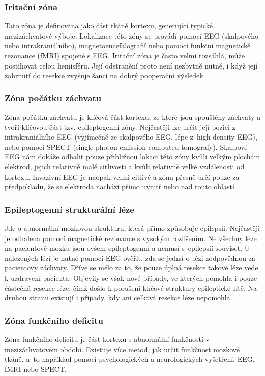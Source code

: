 \subsubsection{Iritační zóna}
Tato zóna je definována jako část tkáně kortexu, generující typické mezizáchvatové výboje. Lokalizace této zóny se provádí pomocí EEG (skalpového nebo intrakraniálního), magnetoencefalografií nebo pomocí funkční magnetické rezonance (fMRI) spojené s EEG. Iritační zóna je často velmi rozsáhlá, může postihovat celou hemisféru. Její odstranění proto není nezbytně nutné, i když její zahrnutí do resekce zvyšuje šanci na dobrý pooperační výsledek. \cite{4}

\subsubsection{Zóna počátku záchvatu}
Zóna počátku záchvatu je klíčová část kortexu, ze které jsou spouštěny záchvaty a tvoří klíčovou část tzv. epileptogenní zóny. Nejčastěji lze určit její pozici z intrakraniálního EEG (vyjímečně ze skalpového EEG, lépe z~high density EEG), nebo pomocí SPECT (single photon emission computed tomografy). Skalpové EEG nám dokáže odhalit pouze přibližnou lokaci této zóny kvůli velkým plochám elektrod, jejich relativně malé citlivosti a kvůli relativně velké vzdálenosti od kortexu. Invazivní EEG je naopak velmi citlivé a zónu přesně určí pouze za předpokladu, že se elektroda nachází přímo uvnitř nebo nad touto oblastí. \cite{4}

\subsubsection{Epileptogenní strukturální léze}
Jde o abnormální mozkovou strukturu, která přímo způsobuje epilepsii. Nejčastěji je odhalena pomocí magnetické rezonance s vysokým rozlišením. Ne všechny léze na pacientově mozku jsou ovšem epileptogenní a nemusí s~epilepsií souviset. U nalezených lézí je nutné pomocí EEG ověřit, zda se jedná o~lézi zodpovědnou za pacientovy záchvaty. Dříve se mělo za to, že pouze úplná resekce takové léze vede k uzdravení pacienta. Objevily se však nové případy, ve kterých pomohla i pouze částečná resekce léze, čímž došlo k porušení klíčové struktury epileptické sítě. Na druhou stranu existují i případy, kdy ani celková resekce léze nepomohla. \cite{4}

\subsubsection{Zóna funkčního deficitu}
Zóna funkčního deficitu je část kortexu s abnormální funkčností v mezizáchvatovém období. Existuje více metod, jak určit funkčnost mozkové tkáně, a~to například pomocí psychologických a neurologických vyšetření, EEG, fMRI nebo SPECT. \cite{4}

